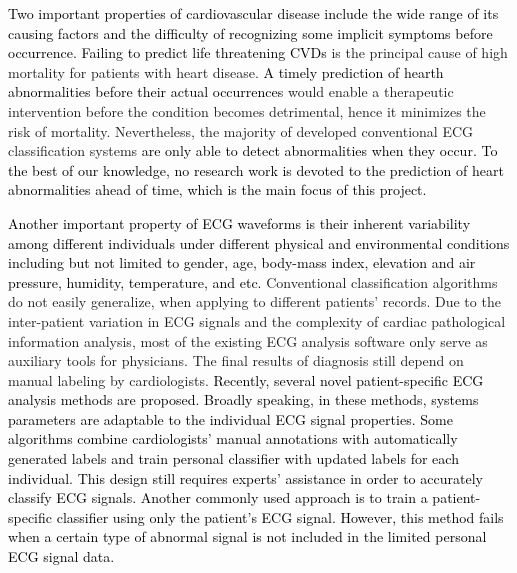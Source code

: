 \textcolor{black}{Two important properties of cardiovascular disease include the wide range of its causing factors and the difficulty of recognizing some implicit symptoms before occurrence\cite{wilson1998prediction, whooley2008depressive}. Failing to predict life threatening CVDs} %
is the principal cause of high mortality for patients with heart disease. 
\textcolor{black}{A timely prediction of hearth abnormalities before their actual occurrences }%
would enable a therapeutic intervention %
before the condition becomes detrimental, hence it minimizes the risk of mortality. Nevertheless, the majority of developed conventional ECG classification systems  \textcolor{black}{are only able to detect abnormalities when they occur. To the best of our knowledge, no research work is devoted to the prediction of heart abnormalities ahead of time, which is the main focus of this project\cite{jambukia2015classification, advancewarning}.} %

\textcolor{black}{Another important property of ECG waveforms is their inherent variability among different individuals under different physical and environmental conditions including but not limited to gender, age, body-mass index, elevation and air pressure, humidity, temperature, and etc\cite{agesex,intervaria}.}
Conventional classification algorithms do not easily generalize, when %
applying to different patients' records\cite{llamedo2012automatic}. 
Due to the inter-patient variation in ECG signals and the complexity of cardiac pathological information analysis, most of the existing ECG analysis software only serve as auxiliary tools for physicians. The final results of diagnosis still depend on manual labeling by cardiologists. \textcolor{black}{Recently, several novel patient-specific ECG analysis methods are proposed. Broadly speaking, in these methods, systems parameters are adaptable to the individual ECG signal properties\cite{Hu_et_al,deChazal2006,llamedo2012automatic,bbnn,ince2009generic,Kiranyaz}. Some algorithms combine cardiologists' manual annotations with automatically generated labels and train personal classifier with updated labels for each individual\cite{Hu_et_al,deChazal2006,llamedo2012automatic}. This design still requires experts' assistance in order to accurately classify ECG signals. Another commonly used approach is to train a patient-specific classifier using only the patient's ECG signal. However, this method fails when a certain type of abnormal signal is not included in the limited personal ECG signal data.}%


